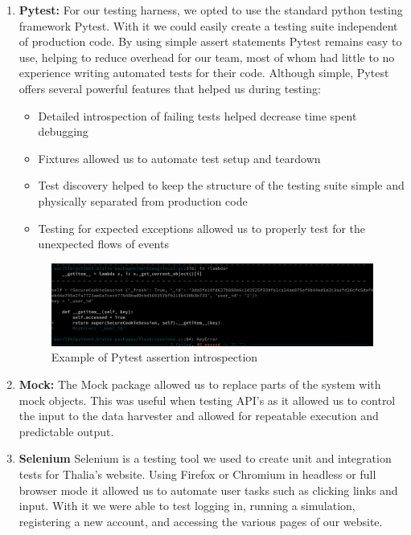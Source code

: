 \documentclass[main.tex]{subfiles}
\begin{document}
\begin{enumerate}
\item \textbf{Pytest:}
For our testing harness, we opted to use the standard python testing framework Pytest. With it we could easily create a testing suite independent of production code. By using simple assert statements Pytest remains easy to use, helping to reduce overhead for our team, most of whom had little to no experience writing automated tests for their code. Although simple, Pytest offers several powerful features that helped us during testing:
\begin{itemize}
\item Detailed introspection of failing tests helped decrease time spent debugging
\item Fixtures allowed us to automate test setup and teardown
\item Test discovery helped to keep the structure of the testing suite simple and physically separated from production code
\item Testing for expected exceptions allowed us to  properly test for the unexpected flows of events
\end{itemize}


\begin{figure}[H]
   \centering
   \includegraphics[scale=0.3]{06Testing/06Pictures/failedTest.png}
   \caption{Example of Pytest assertion introspection}
   \label{Pytest example}
\end{figure}

\item \textbf{Mock:}
The Mock\cite{mock} package allowed us to replace parts of the system with mock objects. This was useful when testing API’s as it allowed us to control the input to the data harvester and allowed for repeatable execution and predictable output.

\item \textbf{Selenium}
Selenium\cite{selenium} is a testing tool we used to create unit and integration tests for Thalia’s website. Using Firefox or Chromium in headless or full browser mode it allowed us to automate user tasks such as clicking links and input. With it we were able to test logging in, running a simulation, registering a new account, and accessing the various pages of our website.


\end{enumerate}
\end{document}

